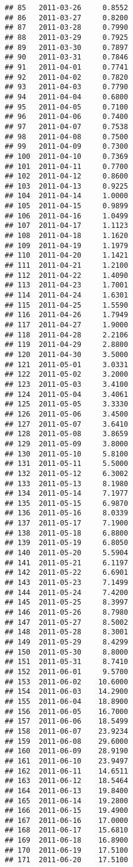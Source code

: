 \documentclass[
]{article}
\begin{document}
\begin{verbatim}
## 85   2011-03-26     0.8552
## 86   2011-03-27     0.8200
## 87   2011-03-28     0.7990
## 88   2011-03-29     0.7925
## 89   2011-03-30     0.7897
## 90   2011-03-31     0.7846
## 91   2011-04-01     0.7741
## 92   2011-04-02     0.7820
## 93   2011-04-03     0.7790
## 94   2011-04-04     0.6800
## 95   2011-04-05     0.7100
## 96   2011-04-06     0.7400
## 97   2011-04-07     0.7538
## 98   2011-04-08     0.7500
## 99   2011-04-09     0.7300
## 100  2011-04-10     0.7369
## 101  2011-04-11     0.7700
## 102  2011-04-12     0.8600
## 103  2011-04-13     0.9225
## 104  2011-04-14     1.0000
## 105  2011-04-15     0.9899
## 106  2011-04-16     1.0499
## 107  2011-04-17     1.1123
## 108  2011-04-18     1.1620
## 109  2011-04-19     1.1979
## 110  2011-04-20     1.1421
## 111  2011-04-21     1.2100
## 112  2011-04-22     1.4090
## 113  2011-04-23     1.7001
## 114  2011-04-24     1.6301
## 115  2011-04-25     1.5590
## 116  2011-04-26     1.7949
## 117  2011-04-27     1.9000
## 118  2011-04-28     2.2106
## 119  2011-04-29     2.8800
## 120  2011-04-30     3.5000
## 121  2011-05-01     3.0331
## 122  2011-05-02     3.2000
## 123  2011-05-03     3.4100
## 124  2011-05-04     3.4061
## 125  2011-05-05     3.3330
## 126  2011-05-06     3.4500
## 127  2011-05-07     3.6410
## 128  2011-05-08     3.8659
## 129  2011-05-09     3.8000
## 130  2011-05-10     5.8100
## 131  2011-05-11     5.5000
## 132  2011-05-12     6.3002
## 133  2011-05-13     8.1980
## 134  2011-05-14     7.1977
## 135  2011-05-15     6.9870
## 136  2011-05-16     8.0339
## 137  2011-05-17     7.1900
## 138  2011-05-18     6.8800
## 139  2011-05-19     6.8050
## 140  2011-05-20     5.5904
## 141  2011-05-21     6.1197
## 142  2011-05-22     6.6901
## 143  2011-05-23     7.1499
## 144  2011-05-24     7.4200
## 145  2011-05-25     8.3997
## 146  2011-05-26     8.7980
## 147  2011-05-27     8.5002
## 148  2011-05-28     8.3001
## 149  2011-05-29     8.4299
## 150  2011-05-30     8.8000
## 151  2011-05-31     8.7410
## 152  2011-06-01     9.5700
## 153  2011-06-02    10.6000
## 154  2011-06-03    14.2900
## 155  2011-06-04    18.8900
## 156  2011-06-05    16.7000
## 157  2011-06-06    18.5499
## 158  2011-06-07    23.9234
## 159  2011-06-08    29.6000
## 160  2011-06-09    28.9190
## 161  2011-06-10    23.9497
## 162  2011-06-11    14.6511
## 163  2011-06-12    18.5464
## 164  2011-06-13    19.8400
## 165  2011-06-14    19.2800
## 166  2011-06-15    19.4900
## 167  2011-06-16    17.0000
## 168  2011-06-17    15.6810
## 169  2011-06-18    16.8900
## 170  2011-06-19    17.5100
## 171  2011-06-20    17.5100

\end{verbatim}
\end{document}
